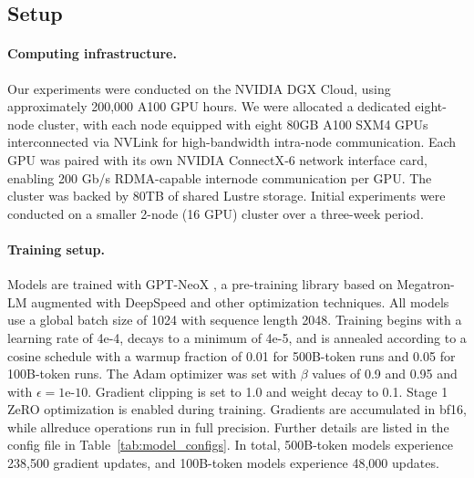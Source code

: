 \subsection{Setup}

\paragraph{Computing infrastructure.} Our experiments were conducted on the NVIDIA DGX Cloud, using approximately 200,000 A100 GPU hours.
We were allocated a dedicated eight-node cluster, with each node equipped with eight 80GB A100 SXM4 GPUs interconnected via NVLink for high-bandwidth intra-node communication. Each GPU was paired with its own NVIDIA ConnectX‑6 network interface card, enabling 200 Gb/s RDMA-capable internode communication per GPU. The cluster was backed by 80TB of shared Lustre storage. Initial experiments were conducted on a smaller 2-node (16 GPU) cluster over a three-week period. 



\paragraph{Training setup.} Models are trained with GPT-NeoX \citep{gpt-neox-library}, a pre-training library based on Megatron-LM \citep{megatron-lm} augmented with DeepSpeed and other optimization techniques.
All models use a global batch size of 1024 with sequence length 2048. Training begins with a learning rate of 4e-4, decays to a minimum of 4e-5, and is annealed according to a cosine schedule with a warmup fraction of 0.01 for 500B-token runs and 0.05 for 100B-token runs. The Adam optimizer was set with $\beta$ values of 0.9 and 0.95 and with $\epsilon = 1\text{e-}10$. Gradient clipping is set to 1.0 and weight decay to 0.1. Stage 1 ZeRO optimization \citep{rajbhandari2020zeromemoryoptimizationstraining} is enabled during training. Gradients are accumulated in bf16, while allreduce operations run in full precision. Further details are listed in the config file in Table~\ref{tab:model_configs}. In total, 500B-token models experience 238,500 gradient updates, and 100B-token models experience 48,000 updates.


